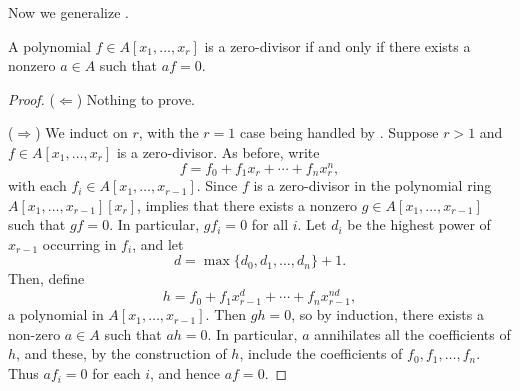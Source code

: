 \begin{solution}
Now we generalize .

\begin{claim}
\label{claim:1.3.iii}
A polynomial \(f\in A[x_1, \ldots, x_r]\) is a zero-divisor if and only if there exists a nonzero \(a \in A\) such that \(a f = 0\).
\end{claim}

\begin{proof}
(\(\Leftarrow\))
Nothing to prove.

(\(\Rightarrow\))
We induct on \(r\), with the \(r = 1\) case being handled by .
Suppose \(r > 1\) and \(f \in A[x_1, \ldots, x_r]\) is a zero-divisor.
As before, write
\begin{equation*}
f = f_0 + f_1 x_r + \cdots + f_n x_r^n,
\end{equation*}
with each \(f_i \in A[x_1, \ldots, x_{r-1}]\).
Since \(f\) is a zero-divisor in the polynomial ring \(A[x_1, \ldots, x_{r-1}][x_r]\),  implies that there exists a nonzero \(g \in A[x_1, \ldots, x_{r-1}]\) such that \(g f = 0\).
In particular, \(g f_i = 0\) for all \(i\).
Let \(d_i\) be the highest power of \(x_{r-1}\) occurring in \(f_i\), and let
\begin{equation*}
d = \max\{d_0, d_1, \ldots, d_n\} + 1.
\end{equation*}
Then, define
\begin{equation*}
h
= f_0 + f_1 x_{r-1}^d + \cdots + f_n x_{r-1}^{n d},
\end{equation*}
a polynomial in \(A[x_1, \ldots, x_{r-1}]\).
Then \(g h = 0\), so by induction, there exists a non-zero \(a \in A\) such that \(a h = 0\).
In particular, \(a\) annihilates all the coefficients of \(h\), and these, by the construction of \(h\), include the coefficients of \(f_0, f_1, \ldots, f_n\).
Thus \(a f_i = 0\) for each \(i\), and hence \(a f = 0\).
\end{proof}
\let\qed\relax
\end{solution}
